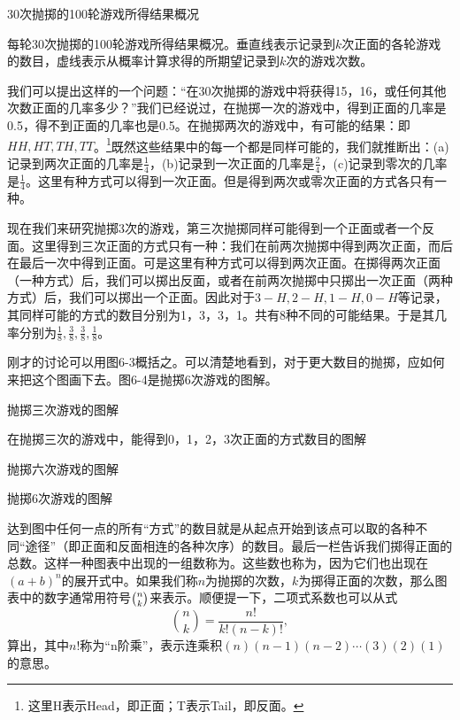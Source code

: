 \documentclass[12pt,oneside]{book}
\begin{document}
\begin{linefig}{30次抛掷的100轮游戏所得结果概况}
\caption{\footnotesize 每轮30次抛掷的100轮游戏所得结果概况。垂直线表示记录到$k$次正面的各轮游戏的数目，虚线表示从概率计算求得的所期望记录到$k$次的游戏次数。}
\label{fig:30次抛掷的100轮游戏所得结果概况}
\end{linefig}

我们可以提出这样的一个问题：“在30次抛掷的游戏中将获得15，16，或任何其他次数正面的几率多少？”我们已经说过，在抛掷一次的游戏中，得到正面的几率是0.5，得不到正面的几率也是0.5。在抛掷两次的游戏中，有可能的结果：即$HH, HT, TH, TT$。\footnote{这里H表示Head，即正面；T表示Tail，即反面。}既然这些结果中的每一个都是同样可能的，我们就推断出：(a)记录到两次正面的几率是$\frac{1}{4}$，(b)记录到一次正面的几率是$\frac{2}{4}$，(c)记录到零次的几率是$\frac{1}{4}$。这里有种方式可以得到一次正面。但是得到两次或零次正面的方式各只有一种。

现在我们来研究抛掷3次的游戏，第三次抛掷同样可能得到一个正面或者一个反面。这里得到三次正面的方式只有一种：我们在前两次抛掷中得到两次正面，而后在最后一次中得到正面。可是这里有种方式可以得到两次正面。在掷得两次正面（一种方式）后，我们可以掷出反面，或者在前两次抛掷中只掷出一次正面（两种方式）后，我们可以掷出一个正面。因此对于$3-H, 2-H, 1-H, 0-H$等记录，其同样可能的方式的数目分别为1，3，3，1。共有8种不同的可能结果。于是其几率分别为$\frac{1}{8}, \frac{3}{8}, \frac{3}{8}, \frac{1}{8} $。

刚才的讨论可以用图6-3概括之。可以清楚地看到，对于更大数目的抛掷，应如何来把这个图画下去。图6-4是抛掷6次游戏的图解。
\begin{fig}{抛掷三次游戏的图解}
\caption{\footnotesize 在抛掷三次的游戏中，能得到0，1，2，3次正面的方式数目的图解}
\label{fig:抛掷三次游戏的图解}
\end{fig}

\begin{fig}{抛掷六次游戏的图解}
\caption{抛掷6次游戏的图解}
\label{fig:抛掷六次游戏的图解}
\end{fig}
达到图中任何一点的所有“方式”的数目就是从起点开始到该点可以取的各种不同“途径”（即正面和反面相连的各种次序）的数目。最后一栏告诉我们掷得正面的总数。这样一种图表中出现的一组数称为。这些数也称为，因为它们也出现在$(a+b)^n$的展开式中。如果我们称$n$为抛掷的次数，$k$为掷得正面的次数，那么图表中的数字通常用符号$\tbinom{n}{k}$来表示。顺便提一下，二项式系数也可以从式
\begin{equation}
\label{Eq:I:6:4}
\binom{n}{k}=\frac{n!}{k!(n-k)!},
\end{equation}
算出，其中$n!$称为“n阶乘”，表示连乘积$(n)(n-1)(n-2)\dotsm(3)(2)(1)$的意思。
\end{document}
